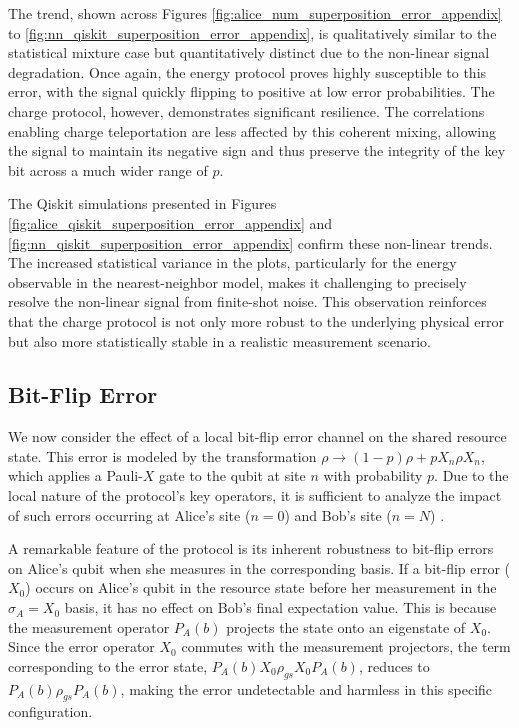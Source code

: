 The trend, shown across Figures \ref{fig:alice_num_superposition_error_appendix} to \ref{fig:nn_qiskit_superposition_error_appendix}, is qualitatively similar to the statistical mixture case but quantitatively distinct due to the non-linear signal degradation. Once again, the energy protocol proves highly susceptible to this error, with the signal quickly flipping to positive at low error probabilities. The charge protocol, however, demonstrates significant resilience. The correlations enabling charge teleportation are less affected by this coherent mixing, allowing the signal to maintain its negative sign and thus preserve the integrity of the key bit across a much wider range of $p$.

The Qiskit simulations presented in Figures \ref{fig:alice_qiskit_superposition_error_appendix} and \ref{fig:nn_qiskit_superposition_error_appendix} confirm these non-linear trends. The increased statistical variance in the plots, particularly for the energy observable in the nearest-neighbor model, makes it challenging to precisely resolve the non-linear signal from finite-shot noise. This observation reinforces that the charge protocol is not only more robust to the underlying physical error but also more statistically stable in a realistic measurement scenario.

\subsection{Bit-Flip Error}



We now consider the effect of a local bit-flip error channel on the shared resource state. This error is modeled by the transformation $\rho \rightarrow (1-p)\rho + pX_{n}\rho X_{n}$, which applies a Pauli-\(X\) gate to the qubit at site $n$ with probability $p$. Due to the local nature of the protocol's key operators, it is sufficient to analyze the impact of such errors occurring at Alice's site ($n=0$) and Bob's site ($n=N$) \cite{QKDbyQET}.

A remarkable feature of the protocol is its inherent robustness to bit-flip errors on Alice's qubit when she measures in the corresponding basis. If a bit-flip error ($X_0$) occurs on Alice's qubit in the resource state before her measurement in the $\sigma_A = X_0$ basis, it has no effect on Bob's final expectation value. This is because the measurement operator $P_A(b)$ projects the state onto an eigenstate of $X_0$. Since the error operator $X_0$ commutes with the measurement projectors, the term corresponding to the error state, $P_A(b)X_0\rho_{gs}X_0P_A(b)$, reduces to $P_A(b)\rho_{gs}P_A(b)$, making the error undetectable and harmless in this specific configuration.

